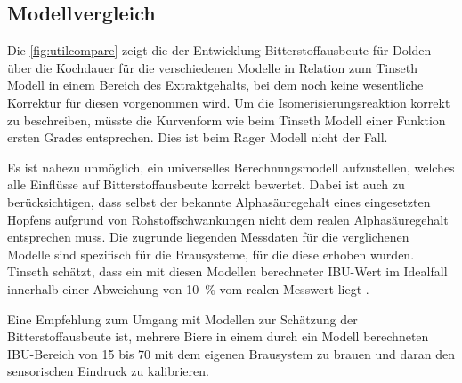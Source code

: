 \documentclass[a4paper,parskip=half]{scrartcl}
\begin{document}
\subsection*{Modellvergleich}

Die \autoref{fig:utilcompare} zeigt die der Entwicklung Bitterstoffausbeute für Dolden über die Kochdauer für die verschiedenen Modelle in Relation zum Tinseth Modell in einem Bereich des Extraktgehalts, bei dem noch keine wesentliche Korrektur für diesen vorgenommen wird. Um die Isomerisierungsreaktion korrekt zu beschreiben, müsste die Kurvenform wie beim Tinseth Modell einer Funktion ersten Grades entsprechen. Dies ist beim Rager Modell nicht der Fall.

Es ist nahezu unmöglich, ein universelles Berechnungsmodell aufzustellen, welches alle Einflüsse auf Bitterstoffausbeute korrekt bewertet. Dabei ist auch zu berücksichtigen, dass selbst der bekannte Alphasäuregehalt eines eingesetzten Hopfens aufgrund von Rohstoffschwankungen nicht dem realen Alphasäuregehalt entsprechen muss. Die zugrunde liegenden Messdaten für die verglichenen Modelle sind spezifisch für die Brausysteme, für die diese erhoben wurden. Tinseth schätzt, dass ein mit diesen Modellen berechneter IBU-Wert im Idealfall innerhalb einer Abweichung von 10~\% vom realen Messwert liegt \parencite[22:05-23:00]{Smith2011}.

Eine Empfehlung zum Umgang mit Modellen zur Schätzung der Bitterstoffausbeute ist, mehrere Biere in einem durch ein Modell berechneten IBU-Bereich von 15 bis 70 mit dem eigenen Brausystem zu brauen und daran den sensorischen Eindruck zu kalibrieren. \parencite{Beechum2017}
\end{document}
